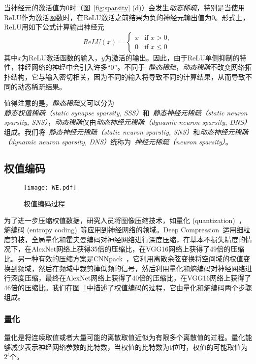 当神经元的激活值为$0$时（图~\ref{fig:sparsity} (d)）会发生\emph{动态稀疏}，特别是当使用ReLU作为激活函数时，在ReLU激活之前结果为负的神经元输出值为$0$。形式上，ReLU用如下公式计算输出神经元
\begin{equation}
ReLU(x)=
\begin{cases}
x & \text{if } x > 0, \\
0 & \text{if } x \leq 0
\end{cases}
\end{equation}
其中$x$为ReLU激活函数的输入，$y$为激活的输出。因此，由于ReLU单侧抑制的特性，神经网络的神经中会引入许多“0”。不同于~\emph{静态稀疏}，\emph{动态稀疏}不改变网络拓扑结构，它与输入密切相关，因为不同的输入将导致不同的计算结果，从而导致不同的动态稀疏结果。

值得注意的是，\emph{静态稀疏}又可以分为\emph{静态权值稀疏（static synapse sparsity, SSS）}和~\emph{静态神经元稀疏（static neuron sparstiy, SNS）}，\emph{动态稀疏}仅由\emph{动态神经元稀疏（dynamic neuron sparsity, DNS）}组成。我们将~\emph{静态神经元稀疏（static neuron sparstiy, SNS）}和\emph{动态神经元稀疏（dynamic neuron sparsity, DNS）}统称为~\emph{神经元稀疏（neuron sparsity）}。

\subsection{权值编码}

\begin{figure}[h]
\centering
\texttt{[image: WE.pdf]}
\caption{权值编码过程}
\label{fig:weight_encoding}
\end{figure}

为了进一步压缩权值数据，研究人员将图像压缩技术，如量化 (quantization)~\cite{henneaux1992quantization}，熵编码 (entropy coding)~\cite{mackay2003information}等应用到神经网络的领域。Deep Compression~\cite{han2015deep}运用细粒度剪枝，全局量化和霍夫曼编码对神经网络进行深度压缩，在基本不损失精度的情况下，在AlexNet网络上获得35倍的压缩比，在VGG16网络上获得了49倍的压缩比。另一种有效的压缩方案是CNNpack~\cite{wang2016cnnpack}，它利用离散余弦变换将空间域的权值变换到频域，然后在频域中裁剪掉低频的信号，然后利用量化和熵编码对神经网络进行深度压缩，最终在AlexNet网络上获得了40倍的压缩比，在VGG16网络上获得了46倍的压缩比。我们在图~\ref{fig:weight_encoding}中描述了权值编码的过程，它由量化和熵编码两个步骤组成。

\subsubsection{量化}
量化是将连续取值或者大量可能的离散取值近似为有限多个离散值的过程。量化能够减少表示神经网络参数的比特数，当权值的比特数为t位时，权值的可能取值为$2^t$个。

